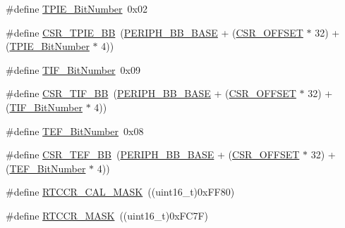 \begin{DoxyCompactItemize}
\item 
\#define \hyperlink{group___b_k_p___private___defines_gac62e6ae9548498efa47fb72637545117}{T\+P\+I\+E\+\_\+\+Bit\+Number}~0x02
\item 
\#define \hyperlink{group___b_k_p___private___defines_ga1f6dcf729994613b21f554ca371d393c}{C\+S\+R\+\_\+\+T\+P\+I\+E\+\_\+\+BB}~(\hyperlink{group___peripheral__memory__map_gaed7efc100877000845c236ccdc9e144a}{P\+E\+R\+I\+P\+H\+\_\+\+B\+B\+\_\+\+B\+A\+SE} + (\hyperlink{group___r_c_c___private___defines_ga984cbe73312b6d3d355c5053763d499a}{C\+S\+R\+\_\+\+O\+F\+F\+S\+ET} $\ast$ 32) + (\hyperlink{group___b_k_p___private___defines_gac62e6ae9548498efa47fb72637545117}{T\+P\+I\+E\+\_\+\+Bit\+Number} $\ast$ 4))
\item 
\#define \hyperlink{group___b_k_p___private___defines_gac8b1b82c7029c05e720c50585762bcf2}{T\+I\+F\+\_\+\+Bit\+Number}~0x09
\item 
\#define \hyperlink{group___b_k_p___private___defines_ga8d9e7cac2321fae6d257e8c1316264e3}{C\+S\+R\+\_\+\+T\+I\+F\+\_\+\+BB}~(\hyperlink{group___peripheral__memory__map_gaed7efc100877000845c236ccdc9e144a}{P\+E\+R\+I\+P\+H\+\_\+\+B\+B\+\_\+\+B\+A\+SE} + (\hyperlink{group___r_c_c___private___defines_ga984cbe73312b6d3d355c5053763d499a}{C\+S\+R\+\_\+\+O\+F\+F\+S\+ET} $\ast$ 32) + (\hyperlink{group___b_k_p___private___defines_gac8b1b82c7029c05e720c50585762bcf2}{T\+I\+F\+\_\+\+Bit\+Number} $\ast$ 4))
\item 
\#define \hyperlink{group___b_k_p___private___defines_gaeb8676e7543d93df60cf7c63fd795672}{T\+E\+F\+\_\+\+Bit\+Number}~0x08
\item 
\#define \hyperlink{group___b_k_p___private___defines_gad60539cc791a26701d414aee529ea203}{C\+S\+R\+\_\+\+T\+E\+F\+\_\+\+BB}~(\hyperlink{group___peripheral__memory__map_gaed7efc100877000845c236ccdc9e144a}{P\+E\+R\+I\+P\+H\+\_\+\+B\+B\+\_\+\+B\+A\+SE} + (\hyperlink{group___r_c_c___private___defines_ga984cbe73312b6d3d355c5053763d499a}{C\+S\+R\+\_\+\+O\+F\+F\+S\+ET} $\ast$ 32) + (\hyperlink{group___b_k_p___private___defines_gaeb8676e7543d93df60cf7c63fd795672}{T\+E\+F\+\_\+\+Bit\+Number} $\ast$ 4))
\item 
\#define \hyperlink{group___b_k_p___private___defines_ga61a540c5dd9d18e936b8fd3e01f7f6ff}{R\+T\+C\+C\+R\+\_\+\+C\+A\+L\+\_\+\+M\+A\+SK}~((uint16\+\_\+t)0x\+F\+F80)
\item 
\#define \hyperlink{group___b_k_p___private___defines_ga4bda91755d5ae28e9e487e946917a1ec}{R\+T\+C\+C\+R\+\_\+\+M\+A\+SK}~((uint16\+\_\+t)0x\+F\+C7\+F)
\end{DoxyCompactItemize}


